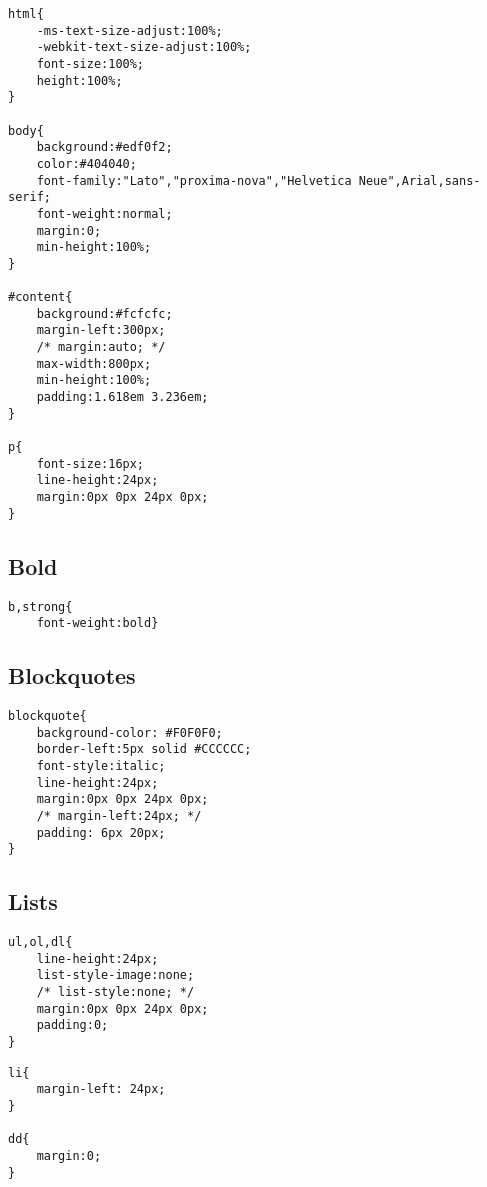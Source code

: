 \documentclass[11pt]{article}
\begin{document}
\begin{verbatim}
html{
    -ms-text-size-adjust:100%;
    -webkit-text-size-adjust:100%;
    font-size:100%;
    height:100%;
}

body{
    background:#edf0f2;
    color:#404040;
    font-family:"Lato","proxima-nova","Helvetica Neue",Arial,sans-serif;
    font-weight:normal;
    margin:0;
    min-height:100%;
}

#content{
    background:#fcfcfc;
    margin-left:300px;
    /* margin:auto; */
    max-width:800px;
    min-height:100%;
    padding:1.618em 3.236em;
}

p{
    font-size:16px;
    line-height:24px;
    margin:0px 0px 24px 0px;
}
\end{verbatim}

\subsection{Bold}
\label{sec:org5f03003}

\begin{verbatim}
b,strong{
    font-weight:bold}
\end{verbatim}

\subsection{Blockquotes}
\label{sec:org81496e1}

\begin{verbatim}
blockquote{
    background-color: #F0F0F0;
    border-left:5px solid #CCCCCC;
    font-style:italic;
    line-height:24px;
    margin:0px 0px 24px 0px;
    /* margin-left:24px; */
    padding: 6px 20px;
}
\end{verbatim}

\subsection{Lists}
\label{sec:org53fd9c9}

\begin{verbatim}
ul,ol,dl{
    line-height:24px;
    list-style-image:none;
    /* list-style:none; */
    margin:0px 0px 24px 0px;
    padding:0;
}
\end{verbatim}

\begin{verbatim}
li{
    margin-left: 24px;
}

dd{
    margin:0;
}
\end{verbatim}
\end{document}
